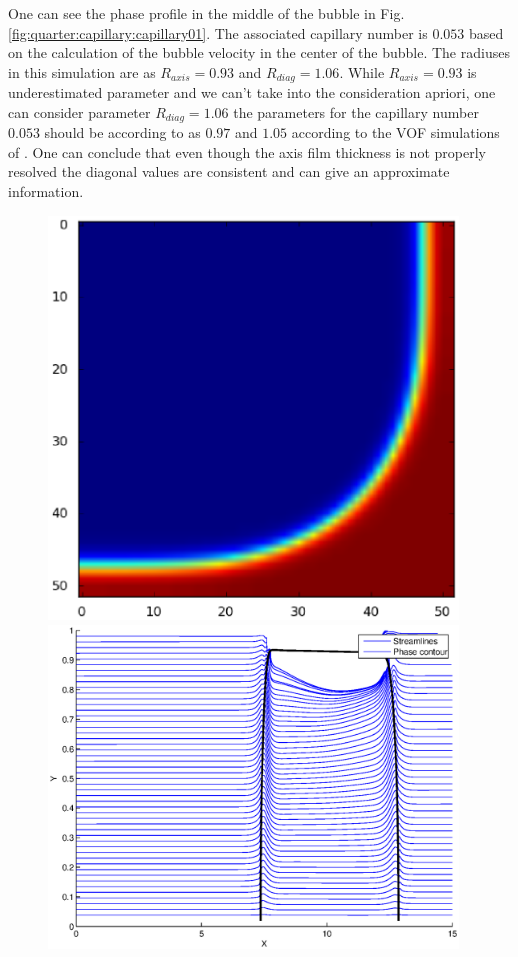 \documentclass{article}
\begin{document}
One can see the phase profile in the middle of the bubble in
Fig.\ref{fig:quarter:capillary:capillary01}. The associated capillary number is $0.053$ based on
the calculation of the bubble velocity in the center of the bubble. The radiuses in this simulation
are as $R_{axis}=0.93$ and $R_{diag}=1.06$. While $R_{axis}=0.93$ is underestimated parameter and
we can't take into the consideration apriori, one can consider parameter $R_{diag}=1.06$ the
parameters for the capillary number $0.053$ should be according to \citet{heil-threedim} as $0.97$
and $1.05$ according to the VOF simulations of \citet{wang-non-circular}. One can conclude that
even though the axis film thickness is not properly resolved the diagonal values are consistent and
can give an approximate information. 
\begin{figure}
\includegraphics[width=0.97\textwidth]{Figures/quarter.eps}\\ %
\includegraphics[width=0.97\textwidth]{Figures/stream_cap01.eps}\\

\end{figure}
\end{document}
